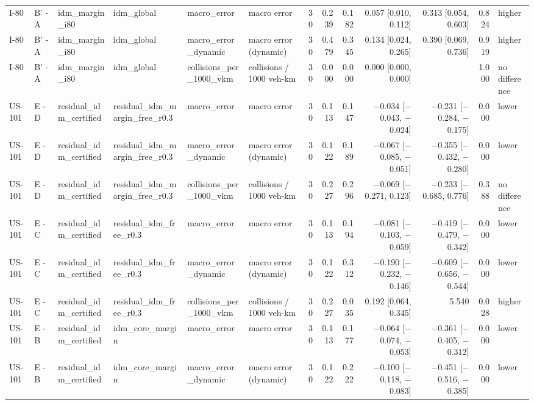 \begin{table}[htbp]
{\begin{tabular}{llllllrrrrrrl}
I-80 & B' - A & idm\_margin\_i80 & idm\_global & macro\_error & macro error & 30 & 0.239 & 0.182 & 0.057 [0.010, 0.112] & 0.313 [0.054, 0.603] & 0.824 & higher \\
I-80 & B' - A & idm\_margin\_i80 & idm\_global & macro\_error\_dynamic & macro error (dynamic) & 30 & 0.479 & 0.345 & 0.134 [0.024, 0.265] & 0.390 [0.069, 0.736] & 0.919 & higher \\
I-80 & B' - A & idm\_margin\_i80 & idm\_global & collisions\_per\_1000\_vkm & collisions / 1000 veh-km & 30 & 0.000 & 0.000 & 0.000 [0.000, 0.000] &  & 1.000 & no difference \\
US-101 & E - D & residual\_idm\_certified & residual\_idm\_margin\_free\_r0.3 & macro\_error & macro error & 30 & 0.113 & 0.147 & $-$0.034 [$-$0.043, $-$0.024] & $-$0.231 [$-$0.284, $-$0.175] & 0.000 & lower \\
US-101 & E - D & residual\_idm\_certified & residual\_idm\_margin\_free\_r0.3 & macro\_error\_dynamic & macro error (dynamic) & 30 & 0.122 & 0.189 & $-$0.067 [$-$0.085, $-$0.051] & $-$0.355 [$-$0.432, $-$0.280] & 0.000 & lower \\
US-101 & E - D & residual\_idm\_certified & residual\_idm\_margin\_free\_r0.3 & collisions\_per\_1000\_vkm & collisions / 1000 veh-km & 30 & 0.227 & 0.296 & $-$0.069 [$-$0.271, 0.123] & $-$0.233 [$-$0.685, 0.776] & 0.388 & no difference \\
US-101 & E - C & residual\_idm\_certified & residual\_idm\_free\_r0.3 & macro\_error & macro error & 30 & 0.113 & 0.194 & $-$0.081 [$-$0.103, $-$0.059] & $-$0.419 [$-$0.479, $-$0.342] & 0.000 & lower \\
US-101 & E - C & residual\_idm\_certified & residual\_idm\_free\_r0.3 & macro\_error\_dynamic & macro error (dynamic) & 30 & 0.122 & 0.312 & $-$0.190 [$-$0.232, $-$0.146] & $-$0.609 [$-$0.656, $-$0.544] & 0.000 & lower \\
US-101 & E - C & residual\_idm\_certified & residual\_idm\_free\_r0.3 & collisions\_per\_1000\_vkm & collisions / 1000 veh-km & 30 & 0.227 & 0.035 & 0.192 [0.064, 0.345] & 5.540 & 0.028 & higher \\
US-101 & E - B & residual\_idm\_certified & idm\_core\_margin & macro\_error & macro error & 30 & 0.113 & 0.177 & $-$0.064 [$-$0.074, $-$0.053] & $-$0.361 [$-$0.405, $-$0.312] & 0.000 & lower \\
US-101 & E - B & residual\_idm\_certified & idm\_core\_margin & macro\_error\_dynamic & macro error (dynamic) & 30 & 0.122 & 0.222 & $-$0.100 [$-$0.118, $-$0.083] & $-$0.451 [$-$0.516, $-$0.385] & 0.000 & lower \\

\end{tabular}}
\end{table}

